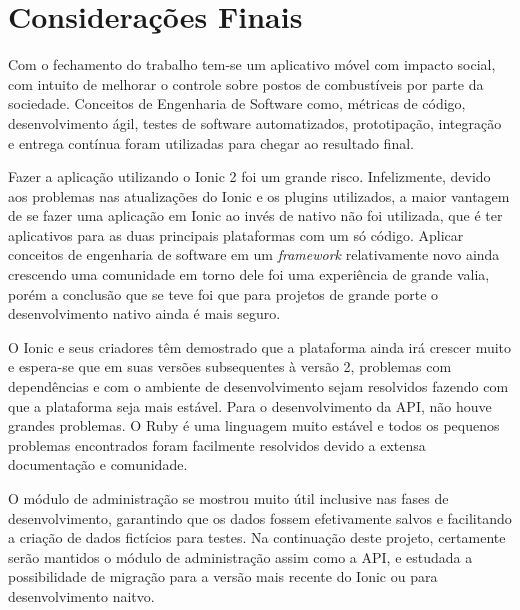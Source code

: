 \section{Considerações Finais}
Com o fechamento do trabalho tem-se um aplicativo móvel com impacto social, com intuito de melhorar o controle sobre postos de combustíveis por parte da sociedade. Conceitos de Engenharia de Software como, métricas de código, desenvolvimento ágil, testes de software automatizados, prototipação, integração e entrega contínua foram utilizadas para chegar ao resultado final.

Fazer a aplicação utilizando o Ionic 2 foi um grande risco. Infelizmente, devido aos problemas nas atualizações do Ionic e os plugins utilizados, a maior vantagem de se fazer uma aplicação em Ionic ao invés de nativo não foi utilizada, que é ter aplicativos para as duas principais plataformas com um só código. Aplicar conceitos de engenharia de software em um \textit{framework} relativamente novo ainda crescendo uma comunidade em torno dele foi uma experiência de grande valia, porém a conclusão que se teve foi que para projetos de grande porte o desenvolvimento nativo ainda é mais seguro.

O Ionic e seus criadores têm demostrado que a plataforma ainda irá crescer muito e espera-se que em suas versões subsequentes à versão 2, problemas com dependências e com o ambiente de desenvolvimento sejam resolvidos fazendo com que a plataforma seja mais estável. Para o desenvolvimento da API, não houve grandes problemas. O Ruby é uma linguagem muito estável e todos os pequenos problemas encontrados foram facilmente resolvidos devido a extensa documentação e comunidade.

O módulo de administração se mostrou muito útil inclusive nas fases de desenvolvimento, garantindo que os dados fossem efetivamente salvos e facilitando a criação de dados fictícios para testes. Na continuação deste projeto, certamente serão mantidos o módulo de administração assim como a API, e estudada a possibilidade de migração para a versão mais recente do Ionic ou para desenvolvimento naitvo.
